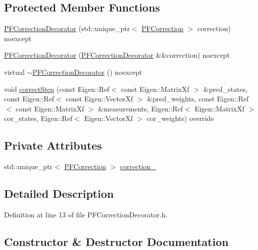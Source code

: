 \subsection*{Protected Member Functions}
\begin{DoxyCompactItemize}
\item 
\mbox{\hyperlink{classbfl_1_1PFCorrectionDecorator_af8114c391487685cc3187ac314a5e236}{P\+F\+Correction\+Decorator}} (std\+::unique\+\_\+ptr$<$ \mbox{\hyperlink{classbfl_1_1PFCorrection}{P\+F\+Correction}} $>$ correction) noexcept
\item 
\mbox{\hyperlink{classbfl_1_1PFCorrectionDecorator_a5cefe8664c7879daf5ce6679436d33a5}{P\+F\+Correction\+Decorator}} (\mbox{\hyperlink{classbfl_1_1PFCorrectionDecorator}{P\+F\+Correction\+Decorator}} \&\&correction) noexcept
\item 
virtual \mbox{\hyperlink{classbfl_1_1PFCorrectionDecorator_a2662b107e2199b27f84ff4da9e188915}{$\sim$\+P\+F\+Correction\+Decorator}} () noexcept
\item 
void \mbox{\hyperlink{classbfl_1_1PFCorrectionDecorator_abb5ab0ef4245b67be546360a54416498}{correct\+Step}} (const Eigen\+::\+Ref$<$ const Eigen\+::\+Matrix\+Xf $>$ \&pred\+\_\+states, const Eigen\+::\+Ref$<$ const Eigen\+::\+Vector\+Xf $>$ \&pred\+\_\+weights, const Eigen\+::\+Ref$<$ const Eigen\+::\+Matrix\+Xf $>$ \&measurements, Eigen\+::\+Ref$<$ Eigen\+::\+Matrix\+Xf $>$ cor\+\_\+states, Eigen\+::\+Ref$<$ Eigen\+::\+Vector\+Xf $>$ cor\+\_\+weights) override
\end{DoxyCompactItemize}
\subsection*{Private Attributes}
\begin{DoxyCompactItemize}
\item 
std\+::unique\+\_\+ptr$<$ \mbox{\hyperlink{classbfl_1_1PFCorrection}{P\+F\+Correction}} $>$ \mbox{\hyperlink{classbfl_1_1PFCorrectionDecorator_ac4a59d72d92138a22ca7894588b54c6a}{correction\+\_\+}}
\end{DoxyCompactItemize}


\subsection{Detailed Description}


Definition at line 13 of file P\+F\+Correction\+Decorator.\+h.



\subsection{Constructor \& Destructor Documentation}
\mbox{\label{classbfl_1_1PFCorrectionDecorator_af8114c391487685cc3187ac314a5e236}} 
